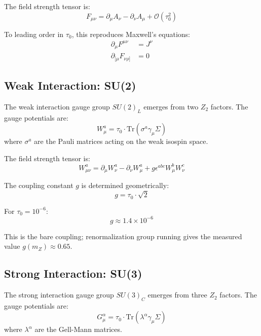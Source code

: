 The field strength tensor is:
\begin{equation}
    F_{\mu\nu} = \partial_\mu A_\nu - \partial_\nu A_\mu + \mathcal{O}(\tau_0^2)
\end{equation}

To leading order in $\tau_0$, this reproduces Maxwell's equations:
\begin{align}
    \partial_\mu F^{\mu\nu} &= J^\nu \\
    \partial_{[\mu} F_{\nu\rho]} &= 0
\end{align}

\subsection{Weak Interaction: SU(2)}

The weak interaction gauge group $SU(2)_L$ emerges from two $Z_2$ factors. The gauge potentials are:
\begin{equation}
    W^a_\mu = \tau_0 \cdot \text{Tr}(\sigma^a \gamma_\mu \Sigma)
\end{equation}
where $\sigma^a$ are the Pauli matrices acting on the weak isospin space.

The field strength tensor is:
\begin{equation}
    W^a_{\mu\nu} = \partial_\mu W^a_\nu - \partial_\nu W^a_\mu + g \epsilon^{abc} W^b_\mu W^c_\nu
\end{equation}

The coupling constant $g$ is determined geometrically:
\begin{equation}
    g = \tau_0 \cdot \sqrt{2}
\end{equation}

For $\tau_0 = 10^{-6}$:
\begin{equation}
    g \approx 1.4 \times 10^{-6}
\end{equation}

This is the bare coupling; renormalization group running gives the measured value $g(m_Z) \approx 0.65$.

\subsection{Strong Interaction: SU(3)}

The strong interaction gauge group $SU(3)_C$ emerges from three $Z_2$ factors. The gauge potentials are:
\begin{equation}
    G^\alpha_\mu = \tau_0 \cdot \text{Tr}(\lambda^\alpha \gamma_\mu \Sigma)
\end{equation}
where $\lambda^\alpha$ are the Gell-Mann matrices.

